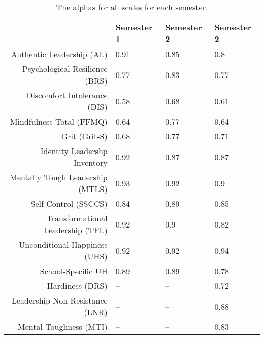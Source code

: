 \begin{table}[ht]
\centering
\begin{tabular}{rlll}
  \hline
 & Semester 1 & Semester 2 & Semester 2 \\ 
  \hline
Authentic Leadership (AL) & 0.91 & 0.85 & 0.8 \\ 
  Psychological Resilience (BRS) & 0.77 & 0.83 & 0.77 \\ 
  Discomfort Intolerance (DIS) & 0.58 & 0.68 & 0.61 \\ 
  Mindfulness Total (FFMQ) & 0.64 & 0.77 & 0.64 \\ 
  Grit (Grit-S) & 0.68 & 0.77 & 0.71 \\ 
  Identity Leadershp Inventory & 0.92 & 0.87 & 0.87 \\ 
  Mentally Tough Leadership (MTLS) & 0.93 & 0.92 & 0.9 \\ 
  Self-Control (SSCCS) & 0.84 & 0.89 & 0.85 \\ 
  Transformational Leadership (TFL) & 0.92 & 0.9 & 0.82 \\ 
  Unconditional Happiness (UHS) & 0.92 & 0.92 & 0.94 \\ 
  School-Specific UH & 0.89 & 0.89 & 0.78 \\ 
  Hardiness (DRS) & -- & -- & 0.72 \\ 
  Leadership Non-Resistance (LNR) & -- & -- & 0.88 \\ 
  Mental Toughness (MTI) & -- & -- & 0.83 \\ 
   \hline
\end{tabular}
\caption{The alphas for all scales for each semester.} 
\label{tab:alphas}
\end{table}
